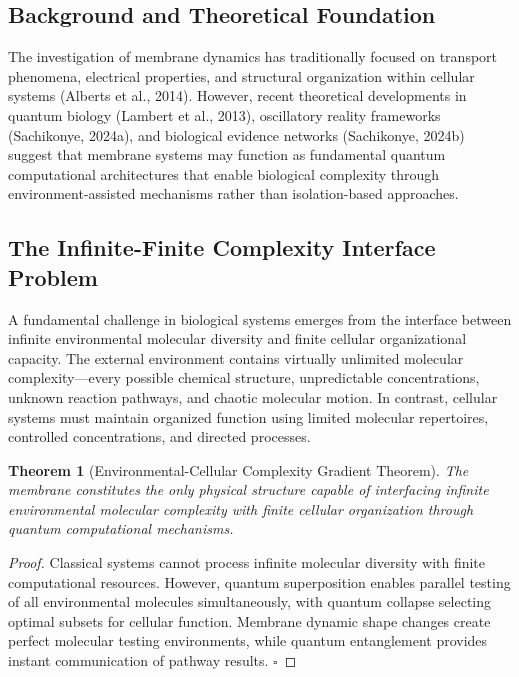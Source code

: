 \documentclass[12pt,a4paper]{article}
\newtheorem{theorem}{Theorem}
\begin{document}
\subsection{Background and Theoretical Foundation}

The investigation of membrane dynamics has traditionally focused on transport phenomena, electrical properties, and structural organization within cellular systems (Alberts et al., 2014). However, recent theoretical developments in quantum biology (Lambert et al., 2013), oscillatory reality frameworks (Sachikonye, 2024a), and biological evidence networks (Sachikonye, 2024b) suggest that membrane systems may function as fundamental quantum computational architectures that enable biological complexity through environment-assisted mechanisms rather than isolation-based approaches.

\subsection{The Infinite-Finite Complexity Interface Problem}

A fundamental challenge in biological systems emerges from the interface between infinite environmental molecular diversity and finite cellular organizational capacity. The external environment contains virtually unlimited molecular complexity—every possible chemical structure, unpredictable concentrations, unknown reaction pathways, and chaotic molecular motion. In contrast, cellular systems must maintain organized function using limited molecular repertoires, controlled concentrations, and directed processes.

\begin{theorem}[Environmental-Cellular Complexity Gradient Theorem]
The membrane constitutes the only physical structure capable of interfacing infinite environmental molecular complexity with finite cellular organization through quantum computational mechanisms.
\end{theorem}

\begin{proof}
Classical systems cannot process infinite molecular diversity with finite computational resources. However, quantum superposition enables parallel testing of all environmental molecules simultaneously, with quantum collapse selecting optimal subsets for cellular function. Membrane dynamic shape changes create perfect molecular testing environments, while quantum entanglement provides instant communication of pathway results. $\square$
\end{proof}
\end{document}
